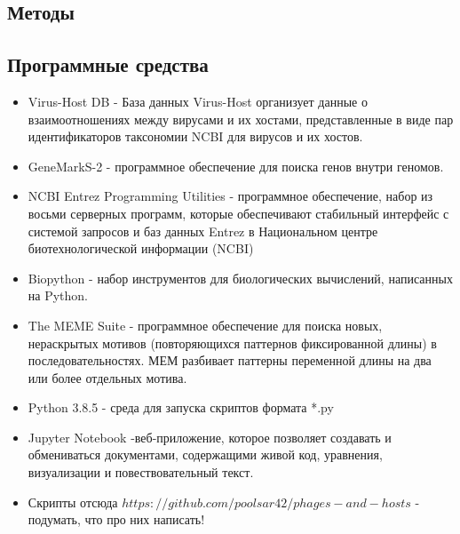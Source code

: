 \documentclass[14pt]{extarticle}
\begin{document}
    
\newpage
\begin{center}
\item \section{Методы} \label{sec:code}
\item \subsection{Программные средства}
\end{center}
\begin{itemize}
    \item Virus-Host DB - База данных Virus-Host организует данные о взаимоотношениях между вирусами и их хостами,
    представленные в виде пар идентификаторов таксономии NCBI для вирусов и их хостов. \cite{virus-host}
    
    \item GeneMarkS-2 - программное обеспечение для поиска генов внутри геномов. \cite{lomsad}
    
    \item NCBI Entrez Programming Utilities - программное обеспечение, набор из восьми серверных программ, которые
    обеспечивают стабильный интерфейс с системой запросов и баз данных Entrez в Национальном центре биотехнологической
    информации (NCBI) \cite{entrez}
    
    \item Biopython - набор инструментов для биологических вычислений, написанных на Python. \cite{biopython}
    
    \item The MEME Suite - программное обеспечение для поиска новых, нераскрытых мотивов (повторяющихся паттернов
    фиксированной длины) в последовательностях. МЕМ разбивает паттерны переменной длины на два или более отдельных
    мотива. \cite{bailey}
    
    \item Python 3.8.5 - среда для запуска скриптов формата *.py \cite{python}
    
    \item Jupyter Notebook -веб-приложение, которое позволяет создавать и обмениваться
    документами, содержащими живой код, уравнения, визуализации и повествовательный текст.\cite{jupyter}
    
    \item Скрипты отсюда \(https://github.com/poolsar42/phages-and-hosts\) - подумать, что про них написать!
    \cite{github}
    

\end{itemize}
\end{document}
